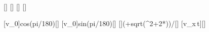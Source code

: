 [\mpss]
[\m]
[\degree]
[\mps]

[v_0\cos\alpha]{\vkX*cos(\alX*pi/180)}[\mps]
[v_0\sin\alpha]{\vkX*sin(\alX*pi/180)}[\mps]
[]{(\vykX+sqrt(\vykX^2+2*\gEX*\hkX))/\gEX}[\s]
[v_x\,t]{\vxkX*\tkX}[\m]
